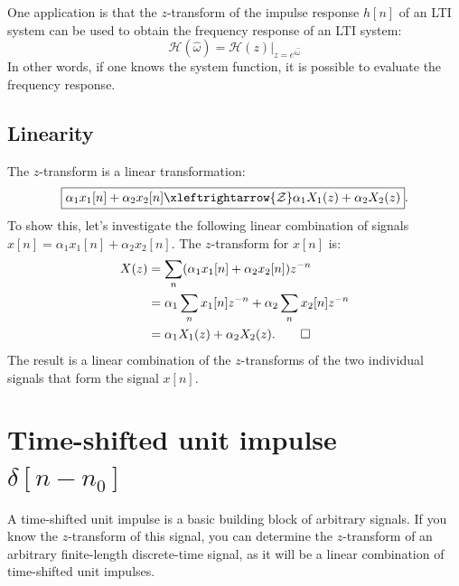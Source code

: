 One application is that the $z$-transform of the impulse response $h[n]$ of
an LTI system can be used to obtain the frequency response of an LTI
system:
\begin{equation}
  \boxed{
    \mathcal{H}(\hat{\omega}) = \mathcal{H}(z)|_{z=e^{i\hat{\omega}}}
    }
  \end{equation}
In other words, if one knows the system function, it is possible to evaluate the frequency response.

\subsection{Linearity}
The $z$-transform is a linear transformation:
\begin{equation}
\boxed{
\alpha_1 x_1[n] + \alpha_2 x_2[n] \xleftrightarrow{\mathcal{Z}} \alpha_1 X_1(z) + \alpha_2 X_2(z)}.
\end{equation}
To show this, let's investigate the following linear combination of
signals $x[n]=\alpha_1 x_1[n] + \alpha_2 x_2[n]$. The $z$-transform for
$x[n]$ is:
\begin{align}
X(z) & = \sum_{n}(\alpha_1 x_1[n] + \alpha_2 x_2[n])z^{-n} \\
     & = \alpha_1 \sum_n x_1[n]z^{-n} + \alpha_2 \sum_n x_2[n] z^{-n} \\
     & = \alpha_1 X_1(z) + \alpha_2 X_2(z). \qed
\end{align}
The result is a linear combination of the $z$-transforms of the two
individual signals that form the signal $x[n]$.


\section{Time-shifted unit impulse $\delta[n-n_0]$}

\begin{marginfigure}
\begin{center}
\end{center}
\caption{A time-shifted unit impulse is a basic building block of
  arbitrary signals. If you know the $z$-transform of this signal, you
  can determine the $z$-transform of an arbitrary finite-length
  discrete-time signal, as it will be a linear combination of time-shifted unit impulses.}
\end{marginfigure}

